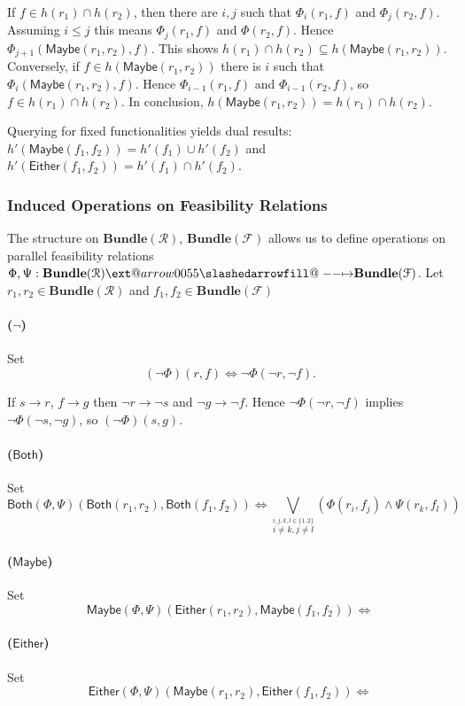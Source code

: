 \documentclass[12pt]{article}
\makeatletter
\theoremstyle{definition}
\theoremstyle{plain}
\theoremstyle{plain}
\theoremstyle{plain}
\theoremstyle{plain}
\theoremstyle{remark}
\theoremstyle{remark}
\newcommand{\mc}[1]{\mathcal{#1}}
\newcommand{\maybe}{\mathsf{Maybe}}
\newcommand{\either}{\mathsf{Either}}
\newcommand{\both}{\mathsf{Both}}
\newcommand{\sub}{\subseteq}
\def\slashedarrowfill@#1#2#3#4#5{%
	$\m@th\thickmuskip0mu\medmuskip\thickmuskip\thinmuskip\thickmuskip
	\relax#5#1\mkern-7mu%
	\cleaders\hbox{$#5\mkern-2mu#2\mkern-2mu$}\hfill
	\mathclap{#3}\mathclap{#2}%
	\cleaders\hbox{$#5\mkern-2mu#2\mkern-2mu$}\hfill
	\mkern-7mu#4$%
}
\def\rightslashedarrowfill@{%
	\slashedarrowfill@\relbar\relbar\mapstochar\rightarrow}
\newcommand\xslashedrightarrow[2][]{%
	\ext@arrow 0055{\rightslashedarrowfill@}{#1}{#2}}
\makeatother
\begin{document}
If $f \in h(r_1) \cap h(r_2)$, then there are $i,j$ such that $\Phi_i(r_1,f)$ and $\Phi_j(r_2,f)$. Assuming $i \leq j$ this means $\Phi_j(r_1,f)$ and $\Phi(r_2,f)$. Hence $\Phi_{j+1}(\maybe(r_1,r_2),f)$. This shows $ h(r_1) \cap h(r_2) \sub h(\maybe(r_1,r_2))$. Conversely, if $f \in h(\maybe(r_1,r_2))$  there is $i$ such that $\Phi_i(\maybe(r_1,r_2),f)$. Hence $\Phi_{i-1}(r_1,f)$ and $\Phi_{i-1}(r_2,f)$, so $f \in  h(r_1) \cap h(r_2)$. In conclusion, $h(\maybe(r_1,r_2)) = h(r_1) \cap h(r_2)$.

Querying for fixed functionalities yields dual results: $h'(\maybe(f_1,f_2)) = h'(f_1) \cup h'(f_2)$ and $h'(\either(f_1,f_2)) = h'(f_1) \cap h'(f_2)$.

\subsubsection{Induced Operations on Feasibility Relations}

The structure on $\mathbf{Bundle}(\mc{R})$, $\mathbf{Bundle}(\mc{F})$ allows us to define operations on parallel feasibility relations  $\Phi, \Psi :\mathbf{Bundle}(\mc{R}) \xslashedrightarrow{} \mathbf{Bundle}(\mc{F})$. Let $r_1,r_2 \in \mathbf{Bundle}(\mc{R})$ and $f_1,f_2 \in \mathbf{Bundle}(\mc{F})$

\paragraph{($\neg$)} Set 
$$(\neg\Phi)(r,f) \Leftrightarrow \neg \Phi(\neg r, \neg f).$$ 

If $s \rightarrow r$, $f \rightarrow g$ then $\neg r \rightarrow \neg s$ and $\neg g \rightarrow \neg f$. Hence $\neg \Phi(\neg r, \neg f)$ implies $\neg \Phi(\neg s, \neg g)$, so $(\neg\Phi)(s,g) $.

\paragraph{($\both$)} Set 
$$\both(\Phi,\Psi)(\both(r_1,r_2),\both(f_1,f_2)) \Leftrightarrow \bigvee_{\stackrel{i,j,k,l \in \{1,2\}}{i \neq k, j \neq l}}(\Phi(r_i,f_j) \wedge \Psi(r_k,f_l))$$

\paragraph{($\maybe$)} Set
$$\maybe(\Phi,\Psi)(\either(r_1,r_2), \maybe(f_1,f_2))  \Leftrightarrow $$


\paragraph{($\either$)} Set
$$\either(\Phi,\Psi)(\maybe(r_1,r_2), \either(f_1,f_2))  \Leftrightarrow $$
\end{document}
